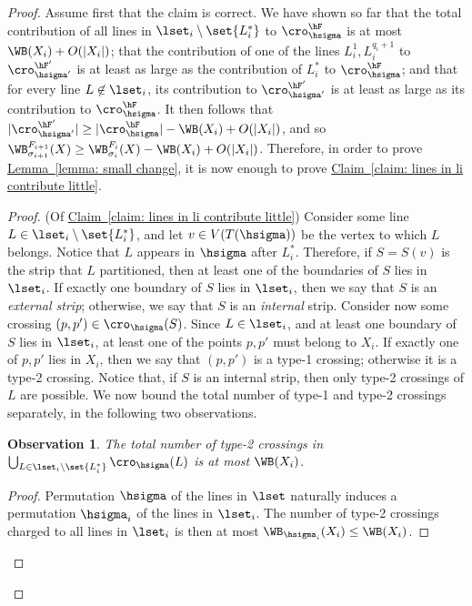 \documentclass[11pt]{article}
\numberwithin{equation}{section}
\theoremstyle{definition}
\theoremstyle{plain}
\newcommand{\expref}[2]{\hyperref[#2]{#1~\ref{#2}}}
\newtheorem{myobs}[theorem]{Observation}
\begin{document}
\begin{proof}
	Assume first that the claim is correct. We have shown so far that the total contribution of all lines in $\lset_i\setminus\set{L_i^*}$ to $\cro^{\hF}_{\hsigma}$ is at most $\WB(X_i)+O(|X_i|)$; that the contribution of one of the lines $L_i^1,L_i^{q_i+1}$ to $\cro^{\hF'}_{\hsigma'}$ is at least as large as the contribution of $L_i^*$ to $\cro^{\hF}_{\hsigma}$; and that for every line $L\not\in \lset_i$, its contribution to $\cro^{\hF'}_{\hsigma'}$ is at least as large as its contribution to $\cro^{\hF}_{\hsigma}$. It then follows that $|\cro^{\hF'}_{\hsigma'}|\geq |\cro^{\hF}_{\hsigma}|-\WB(X_i)+O(|X_i|)$, and so
	$\WB^{F_{i+1}}_{\sigma_{i+1}}(X)\geq \WB^{F_i}_{\sigma_i}(X)-\WB(X_i)+O(|X_i|)$. Therefore, in order to prove \expref{Lemma}{lemma: small change}, it is now enough to prove \expref{Claim}{claim: lines in li contribute little}.
	
	\begin{proof} (Of \expref{Claim}{claim: lines in li contribute little})
		Consider some line $L\in \lset_i\setminus\set{L_i^*}$, and let $v\in V(T({\hsigma}))$ be the vertex to which $L$ belongs. Notice that $L$ appears in $\hsigma$ after $L_i^*$. Therefore, if $S=S(v)$ is the strip that $L$ partitioned, then at least one of the boundaries of $S$ lies in $\lset_i$. If exactly one boundary of $S$ lies in $\lset_i$, then we say that $S$ is an \emph{external strip}; otherwise, we say that $S$ is an \emph{internal} strip. Consider now some crossing $(p,p')\in \cro_{\hsigma}(S)$. Since $L\in \lset_i$, and at least one boundary of $S$ lies in $\lset_i$, at least one of the points $p,p'$ must belong to $X_i$. If exactly one of $p,p'$ lies in $X_i$, then we say that $(p,p')$ is a type-1 crossing; otherwise it is a type-2 crossing. Notice that, if $S$ is an internal strip, then only type-2 crossings of $L$ are possible. We now bound the total number of type-1 and type-2 crossings separately, in the following two observations.
		
		
		\begin{myobs}\label{obs: type 2 crossings}
			The total number of type-2 crossings in $\bigcup_{L\in \lset_i\setminus\set{L_i^*}}\cro_{\hsigma}(L)$ is at most $\WB(X_i)$.
		\end{myobs}
		
		\begin{proof}
			Permutation $\hsigma$ of the lines in $\lset$ naturally induces a permutation $\hsigma_i$ of the lines in $\lset_i$. The number of type-2 crossings charged to all lines in $\lset_i$ is then at most $\WB_{\hsigma_i}(X_i)\leq \WB(X_i)$.%
		\end{proof}
		

\end{proof}
\end{proof}
\end{document}
